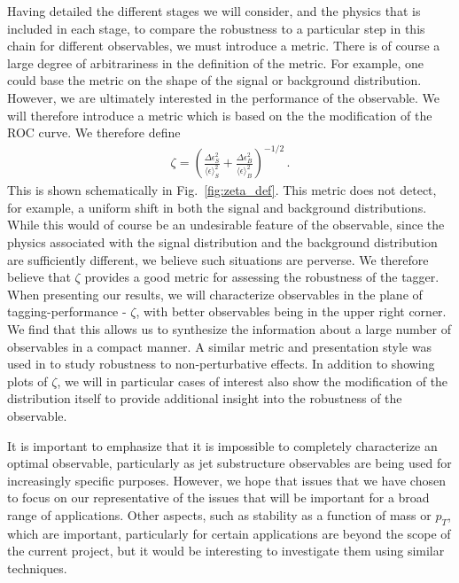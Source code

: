 \documentclass[11pt,letterpaper]{article}
\DeclareRobustCommand{\Fig}[1]{Fig.~\ref{#1}}
\begin{document}
Having detailed the different stages we will consider, and the physics that is included in each stage,  to compare the robustness to a particular step in this chain for different observables, we must introduce a metric. There is of course a large degree of arbitrariness in the definition of the metric. For example, one could base the metric on the shape of the signal or background distribution. However, we are ultimately interested in the performance of the observable. We will therefore introduce a metric which is based on the the modification of the ROC curve. We therefore define
\begin{align}
\zeta=\left(  \frac{\Delta \epsilon_S^2}{ \langle \epsilon \rangle_S^2}  +\frac{\Delta \epsilon_B^2}{ \langle \epsilon \rangle_B^2}  \right)^{-1/2}\,.
\end{align}
This is shown schematically in \Fig{fig:zeta_def}.
This metric does not detect, for example, a uniform shift in both the signal and background distributions. While this would of course be an undesirable feature of the observable, since the physics associated with the signal distribution and the background distribution are sufficiently different, we believe such situations are perverse. We therefore believe that $\zeta$ provides a good metric for assessing the robustness of the tagger. When presenting our results, we will characterize observables in the plane of tagging-performance - $\zeta$, with better observables being in the upper right corner. We find that this allows us to synthesize the information about a large number of observables in a compact manner. A similar metric and presentation style was used in \cite{Salam:2016yht} to study robustness to non-perturbative effects. In addition to showing plots of $\zeta$, we will in particular cases of interest also show the modification of the distribution itself to provide additional insight into the robustness of the observable.


It is important to emphasize that it is impossible to completely characterize an optimal observable, particularly as jet substructure observables are being used for increasingly specific purposes. However, we hope that issues that we have chosen to focus on our representative of the issues that will be important for a broad range of applications. Other aspects, such as stability as a function of mass or $p_T$, which are important, particularly for certain applications are beyond the scope of the current project, but it would be interesting to investigate them using similar techniques.
\end{document}
